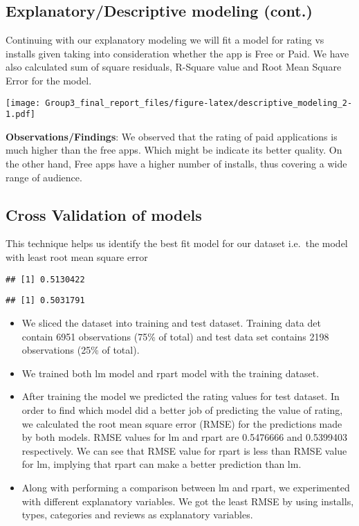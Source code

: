 \documentclass[
]{article}
\providecommand{\tightlist}{%
  \setlength{\itemsep}{0pt}\setlength{\parskip}{0pt}}
\begin{document}
\hypertarget{explanatorydescriptive-modeling-cont.}{%
\subsection{Explanatory/Descriptive modeling
(cont.)}\label{explanatorydescriptive-modeling-cont.}}

Continuing with our explanatory modeling we will fit a model for rating
vs installs given taking into consideration whether the app is Free or
Paid. We have also calculated sum of square residuals, R-Square value
and Root Mean Square Error for the model.

\texttt{[image: Group3\_final\_report\_files/figure-latex/descriptive\_modeling\_2-1.pdf]}

\textbf{Observations/Findings}: We observed that the rating of paid
applications is much higher than the free apps. Which might be indicate
its better quality. On the other hand, Free apps have a higher number of
installs, thus covering a wide range of audience.

\hypertarget{cross-validation-of-models}{%
\subsection{Cross Validation of
models}\label{cross-validation-of-models}}

This technique helps us identify the best fit model for our dataset
i.e.~the model with least root mean square error

\begin{verbatim}
## [1] 0.5130422
\end{verbatim}

\begin{verbatim}
## [1] 0.5031791
\end{verbatim}

\begin{itemize}
\tightlist
\item
  We sliced the dataset into training and test dataset. Training data
  det contain 6951 observations (75\% of total) and test data set
  contains 2198 observations (25\% of total).
\item
  We trained both lm model and rpart model with the training dataset.
\item
  After training the model we predicted the rating values for test
  dataset. In order to find which model did a better job of predicting
  the value of rating, we calculated the root mean square error (RMSE)
  for the predictions made by both models. RMSE values for lm and rpart
  are 0.5476666 and 0.5399403 respectively. We can see that RMSE value
  for rpart is less than RMSE value for lm, implying that rpart can make
  a better prediction than lm.
\item
  Along with performing a comparison between lm and rpart, we
  experimented with different explanatory variables. We got the least
  RMSE by using installs, types, categories and reviews as explanatory
  variables.
\end{itemize}
\end{document}
